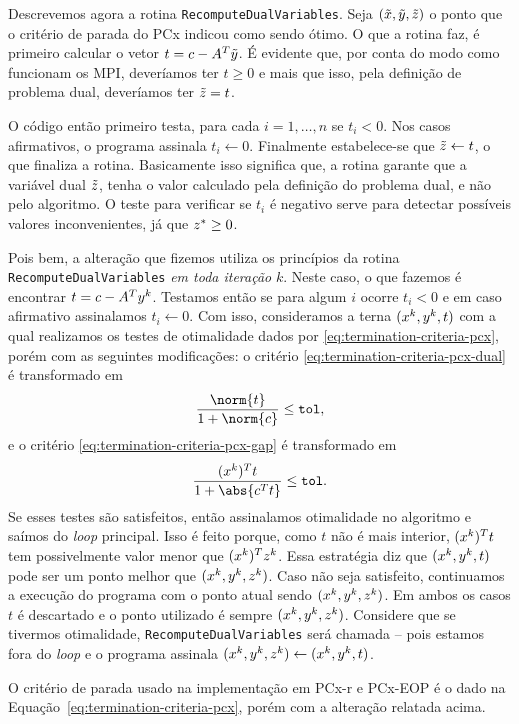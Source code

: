 Descrevemos agora a rotina \verb|RecomputeDualVariables|. Seja $(\tilde{x},\tilde{y},\tilde{z})$ o ponto que o critério de parada do PCx indicou como sendo ótimo. O que a rotina faz, é primeiro calcular o vetor  $t= c - A^T\tilde{y}$. É evidente que, por conta do modo como funcionam os \ac{MPI}, deveríamos ter $t\geq0$ e mais que isso, pela definição de problema dual, deveríamos ter $\tilde{z} = t$. 

 O código então primeiro testa, para cada  $i = 1,\ldots,n$ se $t_{i}<0$.  Nos casos afirmativos, o programa assinala $t_{i}\leftarrow 0$. Finalmente estabelece-se que  $\tilde{z} \leftarrow t $, o que finaliza a rotina. Basicamente isso significa que, a rotina garante que a variável dual $\tilde{z}$, tenha o valor calculado pela definição do problema dual, e não pelo algoritmo. O teste para verificar se $t_{i}$ é negativo serve para detectar possíveis valores inconvenientes, já que $z^*\geq 0$.

 Pois bem, a alteração que fizemos utiliza os princípios da rotina   \verb|RecomputeDualVariables| \emph{em toda iteração} $k$. Neste caso, o que fazemos é encontrar $t= c - A^Ty^{k}$. Testamos então se para algum  $i$ ocorre $t_{i}<0$ e em caso afirmativo assinalamos $t_{i}\leftarrow 0$. Com isso, consideramos a terna $(x^{k},y^{k},t)$ com a qual realizamos os testes de otimalidade dados por
 \eqref{eq:termination-criteria-pcx}, porém com as seguintes modificações: o critério \eqref{eq:termination-criteria-pcx-dual} é transformado em
\[\dfrac{\norm{t}}{1 + \norm{c}} \leq \tol,\]	
e o critério  \eqref{eq:termination-criteria-pcx-gap} é transformado em 
\[
	\dfrac{(\xk)^{T}t}{1 + \abs{c^Tt}}\leq\tol.
\]
Se esses testes são satisfeitos, então assinalamos otimalidade no algoritmo e saímos do \emph{loop} principal. 
Isso é feito porque,  como $t$ não é mais interior, $(x^{k})^{T}t$ tem possivelmente valor menor que $(x^{k})^{T}z^{k}$. Essa estratégia diz que $(x^{k},y^{k},t)$ pode ser um ponto melhor que $(x^{k},y^{k},z^{k})$.  Caso não seja satisfeito, continuamos a execução do programa com o ponto atual sendo $(x^{k},y^{k},z^{k})$. Em ambos os casos $t$ é descartado e o ponto utilizado é sempre $(x^{k},y^{k},z^{k})$. Considere que se tivermos otimalidade, \verb|RecomputeDualVariables| será chamada -- pois estamos fora do \emph{loop} e o programa assinala $(x^{k},y^{k},z^{k})\leftarrow (x^{k},y^{k},t)$. 


O critério de parada usado  na implementação em PCx-r e PCx-EOP é o dado na Equação~\eqref{eq:termination-criteria-pcx}, porém com  a alteração relatada acima. 



